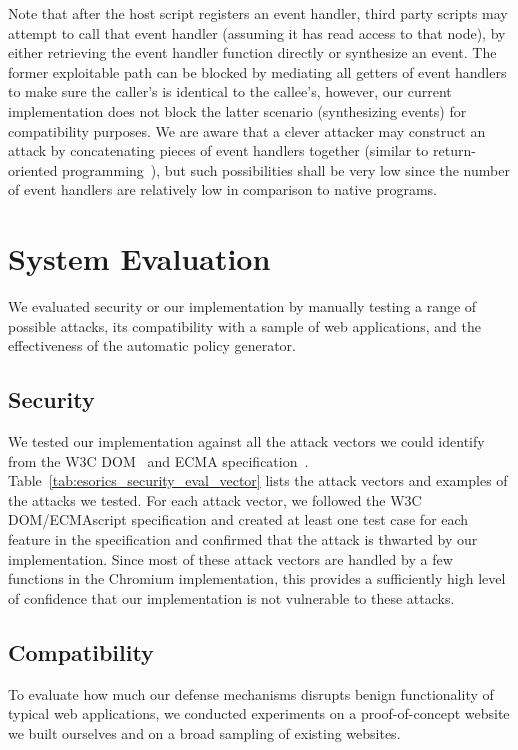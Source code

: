 Note that after the host script registers an event handler, third party scripts may attempt to call that event handler (assuming it has read access to that node), by either retrieving the event handler function directly or synthesize an event.  The former exploitable path can be blocked by mediating all getters of event handlers to make sure the caller's  is identical to the callee's, however, our current implementation does not block the latter scenario (synthesizing events) for compatibility purposes.  We are aware that a clever attacker may construct an attack by concatenating pieces of event handlers together (similar to return-oriented programming~\cite{Shacham:2007:GIF:1315245.1315313}), but such possibilities shall be very low since the number of event handlers are relatively low in comparison to native programs.

\section{System Evaluation}
\label{sec:esorics_evaluation}

We evaluated security or our implementation by manually testing a range of possible attacks, its compatibility with a sample of web applications, and the effectiveness of the automatic policy generator.

\subsection{Security}

We tested our implementation against all the attack vectors we could identify from the W3C DOM~\cite{DOMSpec} and ECMA specification~\cite{ECMAScript}.  Table~\ref{tab:esorics_security_eval_vector} lists the attack vectors and examples of the attacks we tested.  For each attack vector, we followed the W3C DOM/ECMAscript specification and created at least one test case for each feature in the specification and confirmed that the attack is thwarted by our implementation.  Since most of these attack vectors are handled by a few functions in the Chromium implementation, this provides a sufficiently high level of confidence that our implementation is not vulnerable to these attacks.



\subsection{Compatibility}
\label{sec:esorics_eval_compatibility-experiments}
To evaluate how much our defense mechanisms disrupts benign functionality of typical web applications, we conducted experiments on a proof-of-concept website we built ourselves and on a broad sampling of existing websites.

